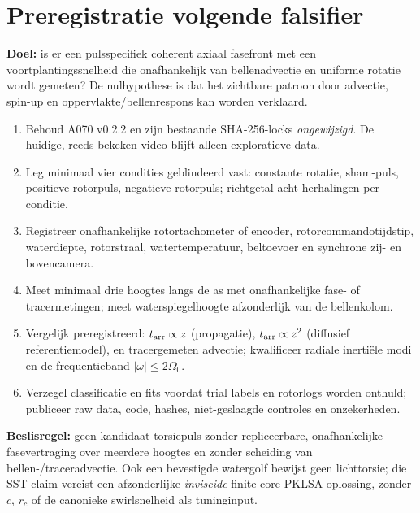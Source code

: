 \documentclass[10pt,a4paper]{article}
\begin{document}
\section{Preregistratie volgende falsifier}
\textbf{Doel:} is er een pulsspecifiek coherent axiaal fasefront met een voortplantingssnelheid die onafhankelijk van bellenadvectie en uniforme rotatie wordt gemeten? De nulhypothese is dat het zichtbare patroon door advectie, spin-up en oppervlakte/bellenrespons kan worden verklaard.
\begin{enumerate}[leftmargin=*,nosep]
\item Behoud A070 v0.2.2 en zijn bestaande SHA-256-locks \emph{ongewijzigd}. De huidige, reeds bekeken video blijft alleen exploratieve data.
\item Leg minimaal vier condities geblindeerd vast: constante rotatie, sham-puls, positieve rotorpuls, negatieve rotorpuls; richtgetal acht herhalingen per conditie.
\item Registreer onafhankelijke rotortachometer of encoder, rotorcommandotijdstip, waterdiepte, rotorstraal, watertemperatuur, beltoevoer en synchrone zij- en bovencamera.
\item Meet minimaal drie hoogtes langs de as met onafhankelijke fase- of tracermetingen; meet waterspiegelhoogte afzonderlijk van de bellenkolom.
\item Vergelijk preregistreerd: $t_{\rm arr}\propto z$ (propagatie), $t_{\rm arr}\propto z^2$ (diffusief referentiemodel), en tracergemeten advectie; kwalificeer radiale inertiële modi en de frequentieband $|\omega|\leq2\Omega_0$.
\item Verzegel classificatie en fits voordat trial labels en rotorlogs worden onthuld; publiceer raw data, code, hashes, niet-geslaagde controles en onzekerheden.
\end{enumerate}
\noindent\textbf{Beslisregel:} geen kandidaat-torsiepuls zonder repliceerbare, onafhankelijke fasevertraging over meerdere hoogtes en zonder scheiding van bellen-/traceradvectie. Ook een bevestigde watergolf bewijst geen lichttorsie; die SST-claim vereist een afzonderlijke \emph{inviscide} finite-core-PKLSA-oplossing, zonder $c$, $r_c$ of de canonieke swirlsnelheid als tuninginput.
\end{document}
